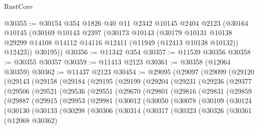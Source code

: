 \begin{lexlean}{RustCore}
\begin{coremodule}
@30355 := @30154
    @354
    @1826
    @40
    @11
    @2342
    @10145
    @2404
    @2123
    (@30164
      @10145
      (@30169
        @10143
        @2397
        (@30173
          @10143
          (@30179
            @10131
            @10138
            @29299
            @14108
            @14112
            @14116
            @12411
            (@11949 (@12413 @10138 @10132))
            @12423))
        @30195))
@30356 := @11342 @354
@30357 := @11539 @30356
@30358 := @30355 @30357
@30359 := @11413 @2123
@30361 := @30358 (@12064 @30359)
@30362 := @11437 @2123
@30454 := @29095
    (@29097
      (@29099
        (@29120
          (@29143
            (@29158
              (@29184
                (@29195
                  (@29199
                    (@29204
                      (@29231
                        (@29236
                          (@29377
                            (@29506
                              (@29521
                                (@29536
                                  (@29551
                                    (@29670
                                      (@29801
                                        (@29816
                                          (@29831
                                            (@29859
                                              (@29887
                                                (@29915
                                                  (@29953
                                                    (@29981
                                                      (@30012
                                                        (@30050
                                                          (@30078
                                                            (@30109
                                                              (@30124
                                                                (@30130
                                                                  (@30133
                                                                    (@30298
                                                                      (@30306
                                                                        (@30314
                                                                          (@30317
                                                                            (@30323
                                                                              (@30326
                                                                                (@30361
                                                                                  (@12068 @30362)

\end{coremodule}
\end{lexlean}

